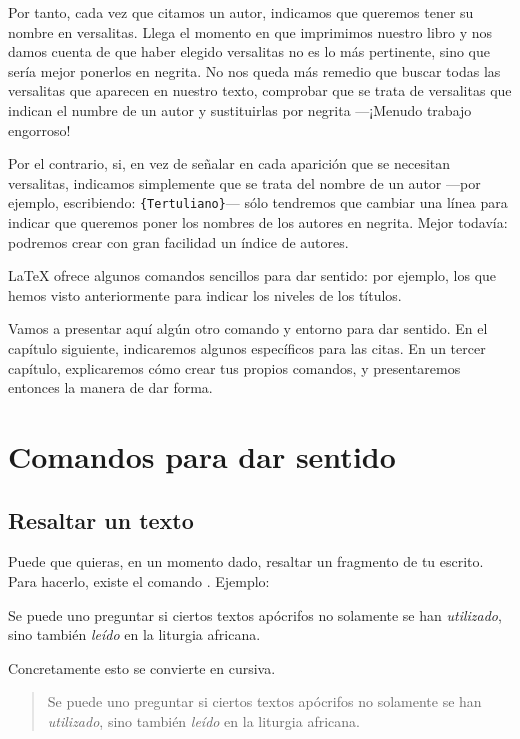 Por tanto, cada vez que citamos un autor, indicamos que queremos tener su nombre en versalitas. Llega el momento en que imprimimos nuestro libro y nos damos cuenta de que haber elegido versalitas no es lo más pertinente, sino que sería mejor ponerlos en negrita. No nos queda más remedio que buscar todas las versalitas que aparecen en nuestro texto, comprobar que se trata de versalitas que indican el numbre de un autor y sustituirlas por negrita ---¡Menudo trabajo engorroso!

Por el contrario, si, en vez de señalar en cada aparición que se necesitan versalitas, indicamos simplemente que se trata del nombre de un autor ---por ejemplo, escribiendo: \verb|{Tertuliano}|--- sólo tendremos que cambiar una línea para indicar que queremos poner los nombres de los autores en negrita. Mejor todavía: podremos crear con gran facilidad un índice de autores.

\LaTeX{} ofrece algunos comandos sencillos para dar sentido: por ejemplo, los que hemos visto anteriormente para indicar los niveles de los títulos.

Vamos a presentar aquí algún otro comando y entorno para dar sentido. En el capítulo siguiente, indicaremos algunos específicos para las citas. En un tercer capítulo, explicaremos cómo crear tus propios comandos, y presentaremos entonces la manera de dar forma.

\section{Comandos para dar sentido}

\subsection{Resaltar un texto}

Puede que quieras, en un momento dado, resaltar un fragmento de tu escrito. Para hacerlo, existe el comando .
Ejemplo:

\begin{latexcode}
Se puede uno preguntar si ciertos textos apócrifos no solamente se han \emph{utilizado}, sino también \emph{leído} en la liturgia africana.
\end{latexcode}

Concretamente esto se convierte en cursiva. 

\begin{quotation}
Se puede uno preguntar si ciertos textos apócrifos no solamente se han \emph{utilizado}, sino también \emph{leído} en la liturgia africana.
\end{quotation}

